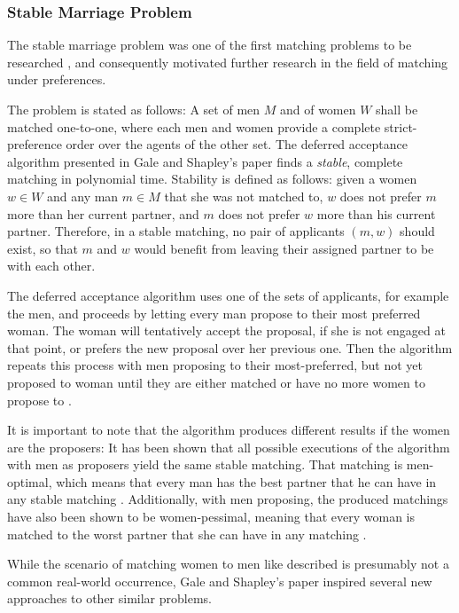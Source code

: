 \subsubsection{Stable Marriage Problem}\label{intro:stable-marriage}
The stable marriage problem was one of the first matching problems to be researched \cite{GaleShapleyOrig}, and consequently motivated further research in the field of matching under preferences.

The problem is stated as follows: A set of men $M$ and of women $W$ shall be matched one-to-one, where each men and women provide a complete strict-preference order over the agents of the other set. The deferred acceptance algorithm presented in Gale and Shapley's paper \cite{GaleShapleyOrig} finds a \emph{stable}, complete matching in polynomial time. Stability is defined as follows: given a women $w \in W$ and any man $m \in M$ that she was not matched to, $w$ does not prefer $m$ more than her current partner, and $m$ does not prefer $w$ more than his current partner. Therefore, in a stable matching, no pair of applicants $(m, w)$ should exist, so that $m$ and $w$ would benefit from leaving their assigned partner to be with each other.

The deferred acceptance algorithm uses one of the sets of applicants, for example the men, and proceeds by letting every man propose to their most preferred woman. The woman will tentatively accept the proposal, if she is not engaged at that point, or prefers the new proposal over her previous one. Then the algorithm repeats this process with men proposing to their most-preferred, but not yet proposed to woman until they are either matched or have no more women to propose to \cite{Gusfield}.

It is important to note that the algorithm produces different results if the women are the proposers: It has been shown that all possible executions of the algorithm with men as proposers yield the same stable matching. That matching is men-optimal, which means that every man has the best partner that he can have in any stable matching \cite{Gusfield}. Additionally, with men proposing, the produced matchings have also been shown to be women-pessimal, meaning that every woman is matched to the worst partner that she can have in any matching \cite{Gusfield}.

While the scenario of matching women to men like described is presumably not a common real-world occurrence, Gale and Shapley's paper inspired several new approaches to other similar problems.

